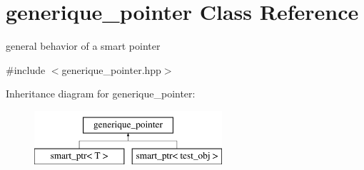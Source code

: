 \hypertarget{classgenerique__pointer}{\section{generique\-\_\-pointer Class Reference}
\label{classgenerique__pointer}
}


general behavior of a smart pointer  




{\ttfamily \#include $<$generique\-\_\-pointer.\-hpp$>$}

Inheritance diagram for generique\-\_\-pointer\-:\begin{figure}[H]
\begin{center}
\leavevmode
\includegraphics[height=2.000000cm]{classgenerique__pointer}
\end{center}
\end{figure}
